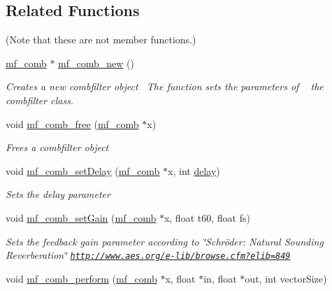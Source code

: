 \subsection*{Related Functions}
(Note that these are not member functions.) \begin{DoxyCompactItemize}
\item 
\mbox{\hyperlink{structmf__comb}{mf\+\_\+comb}} $\ast$ \mbox{\hyperlink{structmf__comb_ad61343b3898251b638559616946d0fc5}{mf\+\_\+comb\+\_\+new}} ()
\begin{DoxyCompactList}\small\item\em Creates a new combfilter object~\newline
 The function sets the parameters of ~\newline
 the combfilter class. \end{DoxyCompactList}\item 
void \mbox{\hyperlink{structmf__comb_a5d57df59f3de97be0e53bd7393fe4f80}{mf\+\_\+comb\+\_\+free}} (\mbox{\hyperlink{structmf__comb}{mf\+\_\+comb}} $\ast$x)
\begin{DoxyCompactList}\small\item\em Frees a combfilter object~\newline
 \end{DoxyCompactList}\item 
void \mbox{\hyperlink{structmf__comb_a2cfc0dd662442bbe974cac0812223522}{mf\+\_\+comb\+\_\+set\+Delay}} (\mbox{\hyperlink{structmf__comb}{mf\+\_\+comb}} $\ast$x, int \mbox{\hyperlink{structmf__comb_a7d1902007eda85c94aab30d2d4c5607a}{delay}})
\begin{DoxyCompactList}\small\item\em Sets the delay parameter ~\newline
 \end{DoxyCompactList}\item 
void \mbox{\hyperlink{structmf__comb_a61decf42d4c9c5dbab662a05c16b69c8}{mf\+\_\+comb\+\_\+set\+Gain}} (\mbox{\hyperlink{structmf__comb}{mf\+\_\+comb}} $\ast$x, float t60, float fs)
\begin{DoxyCompactList}\small\item\em Sets the feedback gain parameter according to \char`\"{}\+Schröder\+: Natural Sounding Reverberation\char`\"{} \href{http://www.aes.org/e-lib/browse.cfm?elib=849}{\tt http\+://www.\+aes.\+org/e-\/lib/browse.\+cfm?elib=849} ~\newline
 \end{DoxyCompactList}\item 
void \mbox{\hyperlink{structmf__comb_aef76b189b3bbef38d1ef4d3e1e4a8fdf}{mf\+\_\+comb\+\_\+perform}} (\mbox{\hyperlink{structmf__comb}{mf\+\_\+comb}} $\ast$x, float $\ast$in, float $\ast$out, int vector\+Size)

\end{DoxyCompactItemize}
